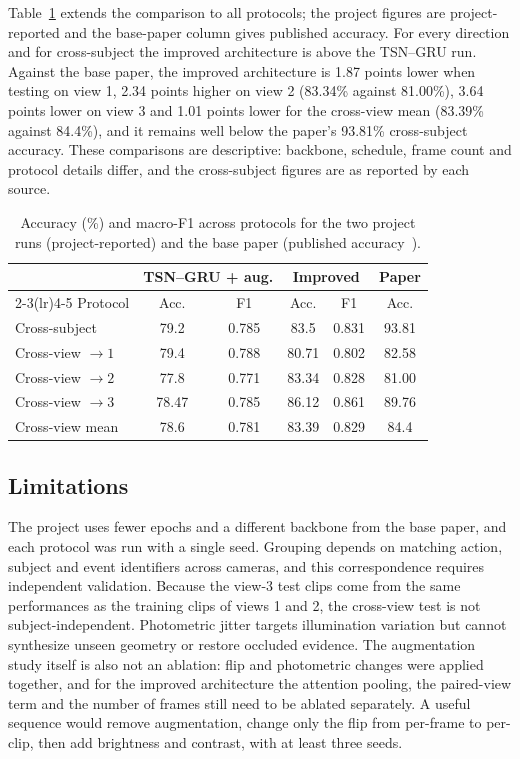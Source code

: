 \documentclass[runningheads]{llncs}
\begin{document}
Table~\ref{tab:protocols} extends the comparison to all protocols; the project figures are project-reported and the base-paper column gives published accuracy. For every direction and for cross-subject the improved architecture is above the TSN--GRU run. Against the base paper, the improved architecture is 1.87 points lower when testing on view 1, 2.34 points higher on view 2 (83.34\% against 81.00\%), 3.64 points lower on view 3 and 1.01 points lower for the cross-view mean (83.39\% against 84.4\%), and it remains well below the paper's 93.81\% cross-subject accuracy. These comparisons are descriptive: backbone, schedule, frame count and protocol details differ, and the cross-subject figures are as reported by each source.

\begin{table}[tb]
\caption{Accuracy (\%) and macro-F1 across protocols for the two project runs (project-reported) and the base paper (published accuracy~\cite{bui}).}\label{tab:protocols}
\centering\small
\begin{tabular}{@{}lccccc@{}}
\toprule
 & \multicolumn{2}{c}{TSN--GRU + aug.} & \multicolumn{2}{c}{Improved} & Paper\\\cmidrule(lr){2-3}\cmidrule(lr){4-5}
Protocol & Acc. & F1 & Acc. & F1 & Acc.\\\midrule
Cross-subject & 79.2 & 0.785 & 83.5 & 0.831 & 93.81\\
Cross-view $\to1$ & 79.4 & 0.788 & 80.71 & 0.802 & 82.58\\
Cross-view $\to2$ & 77.8 & 0.771 & 83.34 & 0.828 & 81.00\\
Cross-view $\to3$ & 78.47 & 0.785 & 86.12 & 0.861 & 89.76\\
Cross-view mean & 78.6 & 0.781 & 83.39 & 0.829 & 84.4\\\bottomrule
\end{tabular}
\end{table}

\subsection{Limitations}
The project uses fewer epochs and a different backbone from the base paper, and each protocol was run with a single seed. Grouping depends on matching action, subject and event identifiers across cameras, and this correspondence requires independent validation. Because the view-3 test clips come from the same performances as the training clips of views 1 and 2, the cross-view test is not subject-independent. Photometric jitter targets illumination variation but cannot synthesize unseen geometry or restore occluded evidence. The augmentation study itself is also not an ablation: flip and photometric changes were applied together, and for the improved architecture the attention pooling, the paired-view term and the number of frames still need to be ablated separately. A useful sequence would remove augmentation, change only the flip from per-frame to per-clip, then add brightness and contrast, with at least three seeds.
\end{document}
